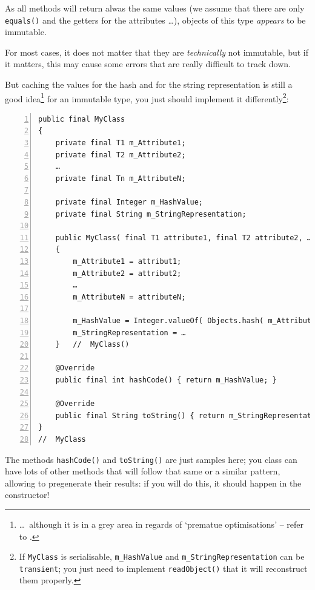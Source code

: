 \documentclass[11pt,a4paper, titlepage, parskip=half, headsepline, footsepline, cleardoublepage=current, headheight=1cm]{scrbook}
\begin{document}
As all methods will return alwas the same values (we assume that there are only \lstinline|equals()| and the getters for the attributes …), objects of this type \textit{appears} to be immutable.

For most cases, it does not matter that they are \textit{technically} not immutable, but if it matters, this may cause some errors that are really difficult to track down.

But caching the values for the hash and for the string representation is still a good idea\footnote{…~although it is in a grey area in regards of ‘prematue optimisations’ – refer to \autocite{Knuth:PrematureOptimization}.} for an immutable type, you just should implement it differently\footnote{If \lstinline|MyClass| is serialisable, \lstinline|m_HashValue| and \lstinline|m_StringRepresentation| can be \lstinline|transient|; you just need to implement \lstinline|readObject()| that it will reconstruct them properly.}: 
\begin{lstlisting}[numbers=left]
public final MyClass
{
    private final T1 m_Attribute1;
    private final T2 m_Attribute2;
    …
    private final Tn m_AttributeN;
    
    private final Integer m_HashValue;
    private final String m_StringRepresentation;

    public MyClass( final T1 attribute1, final T2 attribute2, …, Tn attributeN )
    {
        m_Attribute1 = attribut1;
        m_Attribute2 = attribut2;
        …
        m_AttributeN = attributeN;
        
        m_HashValue = Integer.valueOf( Objects.hash( m_Attribute1, m_Attribute2, …, m_AttributeN );
        m_StringRepresentation = …
    }   //  MyClass()
    
    @Override    
    public final int hashCode() { return m_HashValue; }
    
    @Override
    public final String toString() { return m_StringRepresentation; }
}
//  MyClass    
\end{lstlisting}

The methods \lstinline|hashCode()| and \lstinline|toString()| are just samples here; you class can have lots of other methods that will follow that same or a similar pattern, allowing to pregenerate their results: if you will do this, it should happen in the constructor!
\end{document}
